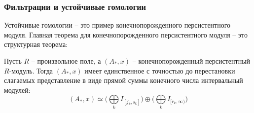 \documentclass{beamer}
\begin{document}
		\begin{frame}%
			\frametitle{Фильтрации и устойчивые гомологии}
			Устойчивые гомологии -- это пример конечнопорожденного персистентного модуля. 
			Главная теорема для конечнопорожденного персистентного модуля -- это структурная теорема:
			\begin{theorem}
				Пусть $R$ -- произвольное поле, а $(A_*, x)$ -- конечнопорожденный персистентный $R$-модуль. Тогда $(A_*, x)$ имеет единственное с точностью до перестановки слагаемых представление в виде прямой суммы конечного числа интервальный модулей:
				\[
				(A_*, x) \simeq \big( \bigoplus\limits_{k} I_{[j_k, s_k]} \big) 
				\oplus 
				\big( \bigoplus\limits_{k} I_{[r_k, \infty)} \big)
				\]
			\end{theorem}
		\end{frame}	
\end{document}
